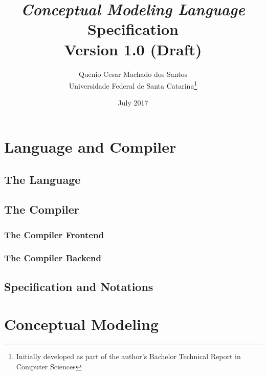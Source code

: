 \documentclass[a4paper,oneside,12pt, extrafontsizes]{memoir}
\title{\emph{Conceptual Modeling Language}\\Specification\\ \small{Version 1.0 (Draft)}}
\author{Quenio Cesar Machado dos Santos\\
\small{Universidade Federal de Santa Catarina}\thanks{
Initially developed as part of the author's Bachelor Technical Report in Computer Sciences}}
\date{July 2017}
\theoremstyle{definition}
\theoremstyle{definition}
\theoremstyle{definition}
\theoremstyle{definition}
\begin{document}
\begin{titlingpage}
\maketitle
\end{titlingpage}

\frontmatter

\begin{KeepFromToc}

\clearpage
\tableofcontents

\clearpage
\listofcodes

\clearpage
\listoffigures

\clearpage
\listoftables

\end{KeepFromToc}

\mainmatter

\part{Language and Compiler}

\chapter{The Language}


\chapter{The Compiler}
\label{ch:compiler}


\section[The Frontend]{The Compiler Frontend}
\label{sec:frontend}


\section[The Backend]{The Compiler Backend}
\label{sec:backend}


\chapter{Specification and Notations}
\label{ch:notations}


\part{Conceptual Modeling}
\end{document}
